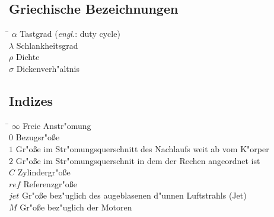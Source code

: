 \subsection*{Griechische Bezeichnungen}
\begin{tabbing}
\hspace*{2cm}\=\kill
$\alpha$ \> Tastgrad (\textit{engl.}: duty cycle) \\[0.2ex]
$\lambda$ \> Schlankheitsgrad \\[0.2ex]
$\rho$ \> Dichte \\[0.2ex]
$\sigma$ \> Dickenverh"altnis \\[0.2ex]

\end{tabbing}



\subsection*{Indizes}
\begin{tabbing}
\hspace*{2cm}\=\kill
$\infty$ \> Freie Anstr"omung \\[0.2ex]
$0$ \> Bezugsr"o\ss{}e \\[0.2ex]
$1$ \> Gr"o\ss{}e im Str"omungsquerschnitt des Nachlaufs weit ab vom K"orper \\[0.2ex]
$2$ \> Gr"o\ss{}e im Str"omungsquerschnit in dem der Rechen angeordnet ist \\[0.2ex]
$C$ \> Zylindergr"o\ss{}e \\[0.2ex]
$ref$ \> Referenzgr"o\ss{}e \\[0.2ex]
$jet$ \> Gr"o\ss{}e bez"uglich des augeblasenen d"unnen Luftstrahls (Jet) \\[0.2ex]
$M$ \> Gr"o\ss{}e bez"uglich der Motoren \\[0.2ex]
\end{tabbing}



